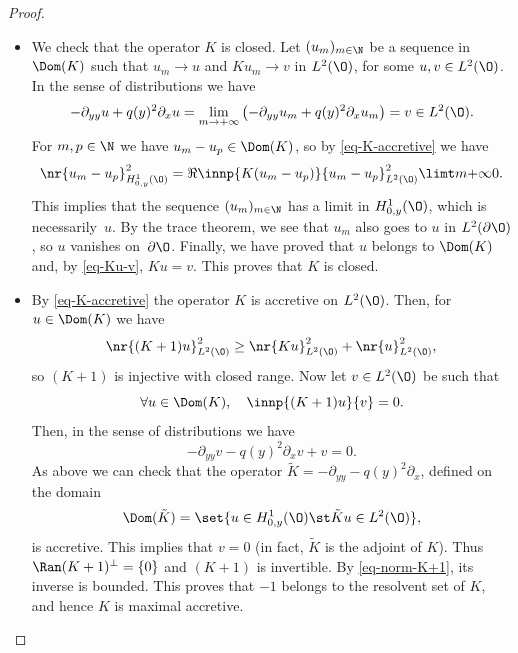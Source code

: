 \begin{proof}
\begin{itemize}
\item
We check that the operator $K$ is closed. Let $(u_m)_{m \in \N}$ be a sequence in $\Dom(K)$ such that $u_m \to u$ and $K u_m \to v$ in $L^2(\O)$, for some $u,v \in L^2(\O)$. In the sense of distributions we have
\begin{equation} \label{eq-Ku-v}
-\partial_{yy} u + q(y)^2 \partial_x u = \lim_{m \to +\infty} \left(-\partial_{yy} u_m + q(y)^2 \partial_x u_m \right) = v \in L^2(\O).
\end{equation}
For $m,p \in \N$ we have $u_m - u_p \in \Dom(K)$, so by \eqref{eq-K-accretive} we have
\begin{align*}
\nr{u_m - u_p}_{H^1_{0,y}(\O)}^2
= \Re \innp{K (u_m-u_p)}{u_m-u_p}_{L^2(\O)}^2
\limt m {+\infty} 0.
\end{align*}
This implies that the sequence $(u_m)_{m \in \N}$ has a limit in $H^1_{0,y}(\O)$, which is necessarily~$u$. By the trace theorem, we see that $u_m$ also goes to $u$ in $L^2(\partial\O)$, so $u$ vanishes on~$\partial \O$. Finally, we have proved that $u$ belongs to $\Dom(K)$ and, by \eqref{eq-Ku-v}, $Ku = v$. This proves that $K$ is closed.

\item
By \eqref{eq-K-accretive} the operator $K$ is accretive on $L^2(\O)$. Then, for $u \in \Dom(K)$ we have 
\begin{equation} \label{eq-norm-K+1}
\begin{aligned}
\nr{(K+1)u}_{L^2(\O)}^2 \geq \nr{Ku}_{L^2(\O)}^2 + \nr{u}_{L^2(\O)}^2,
\end{aligned}
\end{equation}
so $(K+1)$ is injective with closed range. Now let $v \in L^2(\O)$ be such that
\[
\forall u \in \Dom(K), \quad \innp{(K+1)u}{v} = 0.
\]
Then, in the sense of distributions we have
\[
-\partial_{yy} v - q(y)^2 \partial_x v + v = 0.
\]
As above we can check that the operator $\tilde K = -\partial_{yy} - q(y)^2 \partial_x$, defined on the domain
\[
\Dom(\tilde K) = \set{u \in H^1_{0,y}(\O) \st \tilde K u \in L^2(\O)},
\]
is accretive. This implies that $v = 0$ (in fact, $\tilde K$ is the adjoint of $K$). Thus \hbox{$\Ran(K+1)^\bot = \{0\}$} and $(K+1)$ is invertible. By \eqref{eq-norm-K+1}, its inverse is bounded. This proves that $-1$ belongs to the resolvent set of $K$, and hence $K$ is maximal accretive.\qedhere
\end{itemize}
\end{proof}

